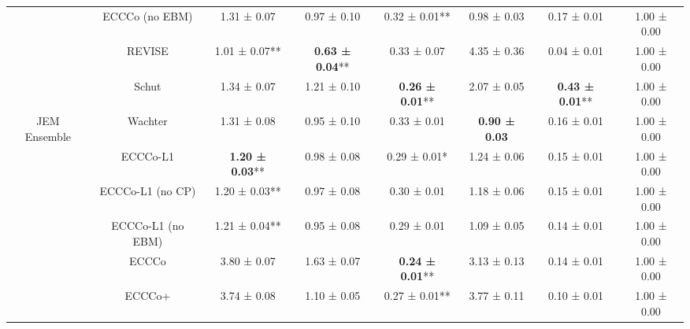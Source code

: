 \begin{table}
{\begin{tabular}[t]{cccccccc}
 & ECCCo (no EBM) & 1.31 ± 0.07\hphantom{*}\hphantom{*} & 0.97 ± 0.10\hphantom{*}\hphantom{*} & 0.32 ± 0.01** & 0.98 ± 0.03\hphantom{*}\hphantom{*} & 0.17 ± 0.01\hphantom{*}\hphantom{*} & 1.00 ± 0.00\hphantom{*}\hphantom{*}\\

 & REVISE & 1.01 ± 0.07** & \textbf{0.63 ± 0.04}** & 0.33 ± 0.07\hphantom{*}\hphantom{*} & 4.35 ± 0.36\hphantom{*}\hphantom{*} & 0.04 ± 0.01\hphantom{*}\hphantom{*} & 1.00 ± 0.00\hphantom{*}\hphantom{*}\\

 & Schut & 1.34 ± 0.07\hphantom{*}\hphantom{*} & 1.21 ± 0.10\hphantom{*}\hphantom{*} & \textbf{0.26 ± 0.01}** & 2.07 ± 0.05\hphantom{*}\hphantom{*} & \textbf{0.43 ± 0.01}** & 1.00 ± 0.00\hphantom{*}\hphantom{*}\\

\multirow[t]{-10}{*}{\centering\arraybackslash JEM Ensemble} & Wachter & 1.31 ± 0.08\hphantom{*}\hphantom{*} & 0.95 ± 0.10\hphantom{*}\hphantom{*} & 0.33 ± 0.01\hphantom{*}\hphantom{*} & \textbf{0.90 ± 0.03}\hphantom{*}\hphantom{*} & 0.16 ± 0.01\hphantom{*}\hphantom{*} & 1.00 ± 0.00\hphantom{*}\hphantom{*}\\
\cmidrule{1-8}
 & ECCCo-L1 & \textbf{1.20 ± 0.03}** & 0.98 ± 0.08\hphantom{*}\hphantom{*} & 0.29 ± 0.01*\hphantom{*} & 1.24 ± 0.06\hphantom{*}\hphantom{*} & 0.15 ± 0.01\hphantom{*}\hphantom{*} & 1.00 ± 0.00\hphantom{*}\hphantom{*}\\

 & ECCCo-L1 (no CP) & 1.20 ± 0.03** & 0.97 ± 0.08\hphantom{*}\hphantom{*} & 0.30 ± 0.01\hphantom{*}\hphantom{*} & 1.18 ± 0.06\hphantom{*}\hphantom{*} & 0.15 ± 0.01\hphantom{*}\hphantom{*} & 1.00 ± 0.00\hphantom{*}\hphantom{*}\\

 & ECCCo-L1 (no EBM) & 1.21 ± 0.04** & 0.95 ± 0.08\hphantom{*}\hphantom{*} & 0.29 ± 0.01\hphantom{*}\hphantom{*} & 1.09 ± 0.05\hphantom{*}\hphantom{*} & 0.14 ± 0.01\hphantom{*}\hphantom{*} & 1.00 ± 0.00\hphantom{*}\hphantom{*}\\

 & ECCCo & 3.80 ± 0.07\hphantom{*}\hphantom{*} & 1.63 ± 0.07\hphantom{*}\hphantom{*} & \textbf{0.24 ± 0.01}** & 3.13 ± 0.13\hphantom{*}\hphantom{*} & 0.14 ± 0.01\hphantom{*}\hphantom{*} & 1.00 ± 0.00\hphantom{*}\hphantom{*}\\

 & ECCCo+ & 3.74 ± 0.08\hphantom{*}\hphantom{*} & 1.10 ± 0.05\hphantom{*}\hphantom{*} & 0.27 ± 0.01** & 3.77 ± 0.11\hphantom{*}\hphantom{*} & 0.10 ± 0.01\hphantom{*}\hphantom{*} & 1.00 ± 0.00\hphantom{*}\hphantom{*}\\


\end{tabular}}
\end{table}
